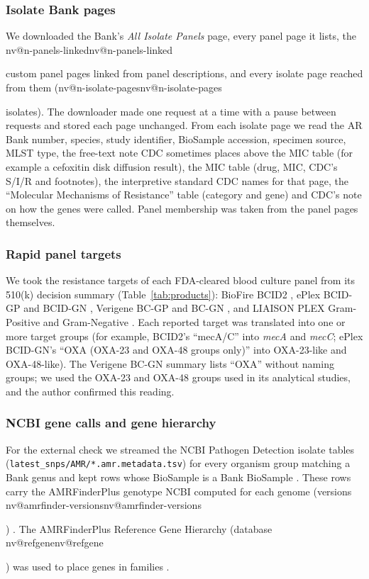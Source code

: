 \documentclass[10pt,twocolumn,letterpaper]{article}
\makeatletter
\newcommand{\nv}[1]{\ifcsname nv@#1\endcsname\csname nv@#1\endcsname\else
  \PackageError{numbers}{Unknown number key: #1}{Run build_assets.py}\fi}
\newcommand{\g}[1]{\textit{#1}}  %
\makeatother
\begin{document}
\subsubsection{Isolate Bank pages}
We downloaded the Bank's \textit{All Isolate Panels} page, every panel page it lists, the \nv{n-panels-linked} custom
panel pages linked from panel descriptions, and every isolate page reached from them (\nv{n-isolate-pages} isolates). The
downloader made one request at a time with a pause between requests and stored each page unchanged. From each isolate
page we read the AR Bank number, species, study identifier, BioSample accession, specimen source, MLST type, the free-text
note CDC sometimes places above the MIC table (for example a cefoxitin disk diffusion result), the MIC table (drug, MIC,
CDC's S/I/R and footnotes), the interpretive standard CDC names for that page, the ``Molecular Mechanisms of
Resistance'' table (category and gene) and CDC's note on how the genes were called. Panel membership was taken from the
panel pages themselves.

\subsubsection{Rapid panel targets}
We took the resistance targets of each FDA-cleared blood culture panel from its 510(k) decision summary
(Table~\ref{tab:products}): BioFire BCID2 \cite{fda_bcid2}, ePlex BCID-GP and BCID-GN \cite{fda_eplexgp,fda_eplexgn},
Verigene BC-GP and BC-GN \cite{fda_vergp,fda_vergn}, and LIAISON PLEX Gram-Positive and Gram-Negative
\cite{fda_lpgp,fda_lpgn}. Each reported target was translated into one or more target groups (for example, BCID2's
``mecA/C'' into \g{mecA} and \g{mecC}; ePlex BCID-GN's ``OXA (OXA-23 and OXA-48 groups only)'' into OXA-23-like and
OXA-48-like). The Verigene BC-GN summary lists ``OXA'' without naming groups; we used the OXA-23 and OXA-48 groups used in
its analytical studies, and the author confirmed this reading.

\begin{table}[t]
\caption{Resistance targets of the FDA-cleared blood culture identification panels included.}
\label{tab:products}
\centering\footnotesize

\end{table}

\subsubsection{NCBI gene calls and gene hierarchy}
For the external check we streamed the NCBI Pathogen Detection isolate tables
(\texttt{latest\_snps/AMR/*.amr.metadata.tsv}) for every organism group matching a Bank genus and kept rows whose
BioSample is a Bank BioSample \cite{ncbipd}. These rows carry the AMRFinderPlus genotype NCBI computed for each genome
(versions \nv{amrfinder-versions}) \cite{feldgarden2021}. The AMRFinderPlus Reference Gene Hierarchy (database
\nv{refgene}) was used to place genes in families \cite{feldgarden2021}.
\end{document}
